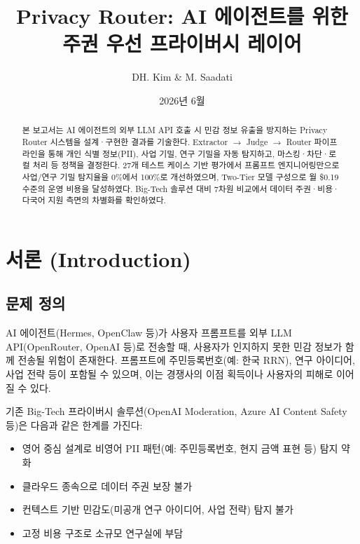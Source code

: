 \documentclass[11pt,a4paper]{article}
\title{Privacy Router: AI 에이전트를 위한 주권 우선 프라이버시 레이어}
\author{DH. Kim \& M. Saadati}
\date{2026년 6월}
\begin{document}
\maketitle

\begin{abstract}
본 보고서는 AI 에이전트의 외부 LLM API 호출 시 민감 정보 유출을 방지하는 Privacy Router 시스템을 설계·구현한 결과를 기술한다. Extractor $\rightarrow$ Judge $\rightarrow$ Router 파이프라인을 통해 개인 식별 정보(PII), 사업 기밀, 연구 기밀을 자동 탐지하고, 마스킹·차단·로컬 처리 등 정책을 결정한다. 27개 테스트 케이스 기반 평가에서 프롬프트 엔지니어링만으로 사업/연구 기밀 탐지율을 0\%에서 100\%로 개선하였으며, Two-Tier 모델 구성으로 월 \$0.19 수준의 운영 비용을 달성하였다. Big-Tech 솔루션 대비 7차원 비교에서 데이터 주권·비용·다국어 지원 측면의 차별화를 확인하였다.
\end{abstract}

\tableofcontents
\newpage

\section{서론 (Introduction)}

\subsection{문제 정의}

AI 에이전트(Hermes, OpenClaw 등)가 사용자 프롬프트를 외부 LLM API(OpenRouter, OpenAI 등)로 전송할 때, 사용자가 인지하지 못한 민감 정보가 함께 전송될 위험이 존재한다. 프롬프트에 주민등록번호(예: 한국 RRN), 연구 아이디어, 사업 전략 등이 포함될 수 있으며, 이는 경쟁사의 이점 획득이나 사용자의 피해로 이어질 수 있다.

기존 Big-Tech 프라이버시 솔루션(OpenAI Moderation, Azure AI Content Safety 등)은 다음과 같은 한계를 가진다:

\begin{itemize}[nosep]
  \item 영어 중심 설계로 비영어 PII 패턴(예: 주민등록번호, 현지 금액 표현 등) 탐지 약화
  \item 클라우드 종속으로 데이터 주권 보장 불가
  \item 컨텍스트 기반 민감도(미공개 연구 아이디어, 사업 전략) 탐지 불가
  \item 고정 비용 구조로 소규모 연구실에 부담
\end{itemize}
\end{document}
